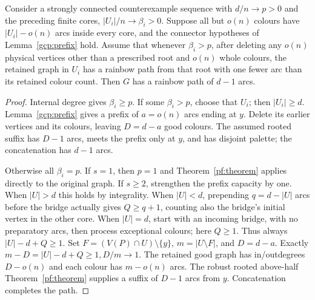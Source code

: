 \begin{proposition}\label{gcp:completion}
Consider a strongly connected counterexample sequence with $d/n\to{}p>0$ and the preceding finite cores, $|U_i|/n\to\beta_i>0$. Suppose all but $o(n)$ colours have $|U_i|-o(n)$ arcs inside every core, and the connector hypotheses of Lemma~\ref{gcp:prefix} hold. Assume that whenever $\beta_i>p$, after deleting any $o(n)$ physical vertices other than a prescribed root and $o(n)$ whole colours, the retained graph in $U_i$ has a rainbow path from that root with one fewer arc than its retained colour count. Then $G$ has a rainbow path of $d-1$ arcs.
\end{proposition}
\begin{proof}
Internal degree gives $\beta_i\ge{}p$. If some $\beta_i>p$, choose that $U_i$; then $|U_i|\ge{}d$. Lemma~\ref{gcp:prefix} gives a prefix of $a=o(n)$ arcs ending at $y$. Delete its earlier vertices and its colours, leaving $D=d-a$ good colours. The assumed rooted suffix has $D-1$ arcs, meets the prefix only at $y$, and has disjoint palette; the concatenation has $d-1$ arcs.

Otherwise all $\beta_i=p$. If $s=1$, then $p=1$ and Theorem~\ref{pf:theorem} applies directly to the original graph. If $s\ge2$, strengthen the prefix capacity by one. When $|U|>d$ this holds by integrality. When $|U|<d$, prepending $q=d-|U|$ arcs before the bridge actually gives $Q\ge{}q+1$, counting also the bridge's initial vertex in the other core. When $|U|=d$, start with an incoming bridge, with no preparatory arcs, then process exceptional colours; here $Q\ge1$. Thus always $|U|-d+Q\ge1$. Set $F=(V(P)\cap{}U)\setminus\{y\}$, $m=|U\setminus{}F|$, and $D=d-a$. Exactly $m-D=|U|-d+Q\ge1,D/m\longrightarrow1$. The retained good graph has in/outdegrees $D-o(n)$ and each colour has $m-o(n)$ arcs. The robust rooted above-half Theorem~\ref{pf:theorem} supplies a suffix of $D-1$ arcs from $y$. Concatenation completes the path.
\end{proof}
